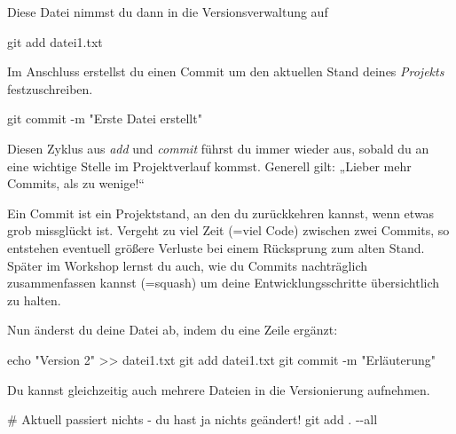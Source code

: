 \documentclass[
  letterpaper,
  DIV=11]{scrreprt}
\newenvironment{Shaded}{\begin{snugshade}}{\end{snugshade}}
\newcommand{\AttributeTok}[1]{\textcolor[rgb]{0.40,0.45,0.13}{#1}}
\newcommand{\BuiltInTok}[1]{\textcolor[rgb]{0.00,0.23,0.31}{#1}}
\newcommand{\CommentTok}[1]{\textcolor[rgb]{0.37,0.37,0.37}{#1}}
\newcommand{\FunctionTok}[1]{\textcolor[rgb]{0.28,0.35,0.67}{#1}}
\newcommand{\NormalTok}[1]{\textcolor[rgb]{0.00,0.23,0.31}{#1}}
\newcommand{\OperatorTok}[1]{\textcolor[rgb]{0.37,0.37,0.37}{#1}}
\newcommand{\StringTok}[1]{\textcolor[rgb]{0.13,0.47,0.30}{#1}}
\begin{document}
Diese Datei nimmst du dann in die Versionsverwaltung auf

\begin{Shaded}
\begin{Highlighting}[]
\FunctionTok{git}\NormalTok{ add datei1.txt }
\end{Highlighting}
\end{Shaded}

Im Anschluss erstellst du einen Commit um den aktuellen Stand deines
\emph{Projekts} festzuschreiben.

\begin{Shaded}
\begin{Highlighting}[]
\FunctionTok{git}\NormalTok{ commit }\AttributeTok{{-}m} \StringTok{"Erste Datei erstellt"}
\end{Highlighting}
\end{Shaded}

Diesen Zyklus aus \emph{add} und \emph{commit} führst du immer wieder
aus, sobald du an eine wichtige Stelle im Projektverlauf kommst.
Generell gilt: „Lieber mehr Commits, als zu wenige!{}``

Ein Commit ist ein Projektstand, an den du zurückkehren kannst, wenn
etwas grob missglückt ist. Vergeht zu viel Zeit (=viel Code) zwischen
zwei Commits, so entstehen eventuell größere Verluste bei einem
Rücksprung zum alten Stand.\\
Später im Workshop lernst du auch, wie du Commits nachträglich
zusammenfassen kannst (=squash) um deine Entwicklungsschritte
übersichtlich zu halten.

Nun änderst du deine Datei ab, indem du eine Zeile ergänzt:

\begin{Shaded}
\begin{Highlighting}[]
\BuiltInTok{echo} \StringTok{"Version 2"} \OperatorTok{\textgreater{}\textgreater{}}\NormalTok{ datei1.txt }
\FunctionTok{git}\NormalTok{ add datei1.txt }
\FunctionTok{git}\NormalTok{ commit }\AttributeTok{{-}m} \StringTok{"Erläuterung"}
\end{Highlighting}
\end{Shaded}

Du kannst gleichzeitig auch mehrere Dateien in die Versionierung
aufnehmen.

\begin{Shaded}
\begin{Highlighting}[]
\CommentTok{\# Aktuell passiert nichts {-} du hast ja nichts geändert!}
\FunctionTok{git}\NormalTok{ add . }\AttributeTok{{-}{-}all} 
\end{Highlighting}
\end{Shaded}
\end{document}
